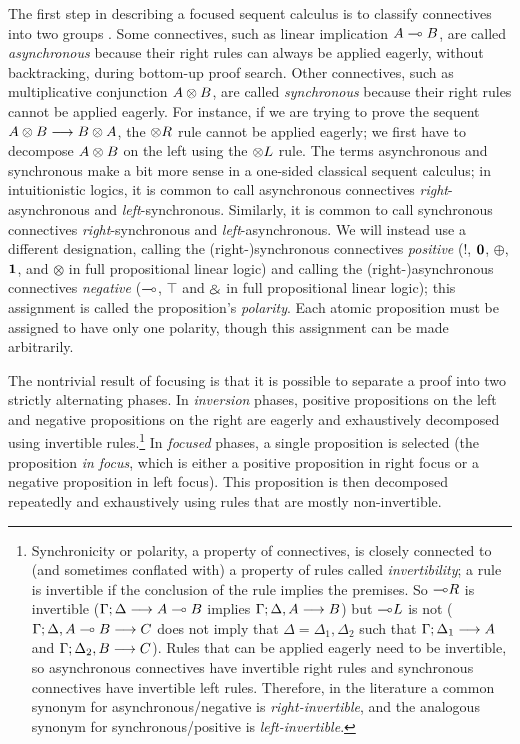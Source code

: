 The first step in describing a focused sequent calculus is to classify
connectives into two groups \cite{andreoli92logic}.  Some connectives,
such as linear implication $A \multimap B$, are called {\it asynchronous}
because their right rules can always be applied eagerly, without
backtracking, during bottom-up proof search. Other connectives, such
as multiplicative conjunction $A \otimes B$, are called {\it
  synchronous} because their right rules cannot be applied
eagerly. For instance, if we are trying to prove the sequent $A
\otimes B \longrightarrow B \otimes A$, the ${\otimes}R$ rule cannot
be applied eagerly; we first have to decompose $A \otimes B$ on the
left using the ${\otimes}L$ rule.  The terms asynchronous and
synchronous make a bit more sense in a one-sided classical sequent
calculus; in intuitionistic logics, it is common to call asynchronous
connectives {\it right}-asynchronous and {\it
  left}-synchronous. Similarly, it is common to call synchronous
connectives {\it right}-synchronous and {\it left}-asynchronous.  We
will instead use a different designation, calling the
(right-)synchronous connectives {\it positive} (${!}$, $\mathbf{0}$, $\oplus$,
$\mathbf{1}$, and $\otimes$ in full propositional linear logic) and calling
the (right-)asynchronous connectives {\it negative} ($\multimap$, $\top$
and $\mathbin{\binampersand}$ in full propositional linear logic); this assignment is
called the proposition's {\it polarity}. Each atomic proposition must
be assigned to have only one polarity, though this assignment can be
made arbitrarily.

The nontrivial result of focusing is that it is possible to separate a
proof into two strictly alternating phases. In {\it inversion} phases,
positive propositions on the left and negative propositions on the
right are eagerly and exhaustively decomposed using invertible
rules.\footnote{Synchronicity or polarity, a property of connectives,
  is closely connected to (and sometimes conflated with) a property of
  rules called {\it invertibility}; a rule is invertible if the
  conclusion of the rule implies the premises. So ${\multimap}R$ is
  invertible (${\Gamma};{\Delta} \longrightarrow {A \multimap B} \mathstrut$ implies
  ${\Gamma};{\Delta, A} \longrightarrow {B} \mathstrut$) but ${\multimap}L$ is not
  (${\Gamma};{\Delta, A \multimap B} \longrightarrow {C} \mathstrut$ does not imply that $\Delta =
  \Delta_1, \Delta_2$ such that ${\Gamma};{\Delta_1} \longrightarrow {A} \mathstrut$ and
  ${\Gamma};{\Delta_2, B} \longrightarrow {C} \mathstrut$).  Rules that can be applied eagerly
  need to be invertible, so asynchronous connectives have invertible
  right rules and synchronous connectives have invertible left
  rules. Therefore, in the literature a common synonym for
  asynchronous/negative is {\it right-invertible}, and the analogous
  synonym for synchronous/positive is {\it left-invertible}.}  In {\it
  focused} phases, a single proposition is selected (the proposition
{\it in focus}, which is either a positive proposition in right focus
or a negative proposition in left focus). This
proposition is then decomposed repeatedly and
exhaustively using rules that are mostly non-invertible.

